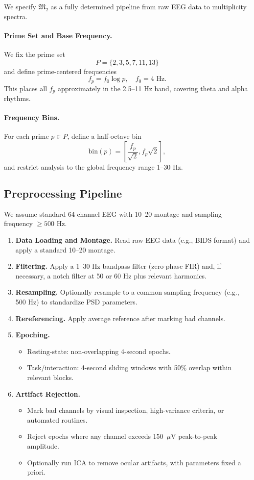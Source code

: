 \documentclass[11pt]{article}
\begin{document}
We specify \(\mathfrak{M}_2\) as a fully determined pipeline from raw EEG data to multiplicity spectra.

\paragraph{Prime Set and Base Frequency.}
We fix the prime set
\[
  P = \{2,3,5,7,11,13\}
\]
and define prime-centered frequencies
\[
  f_p = f_0 \log p,\quad f_0 = 4 \text{ Hz}.
\]
This places all \(f_p\) approximately in the 2.5--11 Hz band, covering theta and alpha rhythms.

\paragraph{Frequency Bins.}
For each prime \(p\in P\), define a half-octave bin
\[
  \mathrm{bin}(p) = \left[ \frac{f_p}{\sqrt{2}}, f_p \sqrt{2} \right],
\]
and restrict analysis to the global frequency range 1--30 Hz.

\subsection{Preprocessing Pipeline}

We assume standard 64-channel EEG with 10--20 montage and sampling frequency \(\geq 500\) Hz.

\begin{enumerate}[label=\arabic*., leftmargin=*]
  \item \textbf{Data Loading and Montage.} Read raw EEG data (e.g., BIDS format) and apply a standard 10--20 montage.
  \item \textbf{Filtering.} Apply a 1--30 Hz bandpass filter (zero-phase FIR) and, if necessary, a notch filter at 50 or 60 Hz plus relevant harmonics.
  \item \textbf{Resampling.} Optionally resample to a common sampling frequency (e.g., 500 Hz) to standardize PSD parameters.
  \item \textbf{Rereferencing.} Apply average reference after marking bad channels.
  \item \textbf{Epoching.}
  \begin{itemize}
    \item Resting-state: non-overlapping 4-second epochs.
    \item Task/interaction: 4-second sliding windows with 50\% overlap within relevant blocks.
  \end{itemize}
  \item \textbf{Artifact Rejection.}
  \begin{itemize}
    \item Mark bad channels by visual inspection, high-variance criteria, or automated routines.
    \item Reject epochs where any channel exceeds 150~\(\mu\)V peak-to-peak amplitude.
    \item Optionally run ICA to remove ocular artifacts, with parameters fixed a priori.
  \end{itemize}
\end{enumerate}
\end{document}
